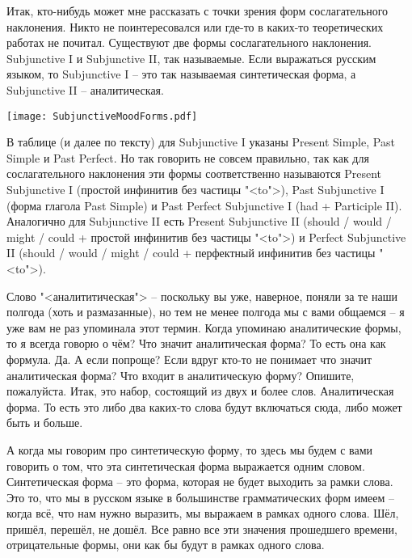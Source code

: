 \documentclass[main.tex]{subfiles}
\begin{document}
Итак, кто-нибудь может мне рассказать с точки зрения форм сослагательного наклонения.
Никто не поинтересовался или где-то в каких-то теоретических работах не почитал.
Существуют две формы сослагательного наклонения.
Subjunctive I и Subjunctive II, так называемые.
Если выражаться русским языком, то Subjunctive I -- это так называемая синтетическая форма, а Subjunctive II -- аналитическая.

\hypertarget{subjunctive-mood-forms-table}{}
{\parindent0pt\texttt{[image: SubjunctiveMoodForms.pdf]}}

 В таблице (и далее по тексту) для Subjunctive I указаны Present Simple, Past Simple и Past Perfect.
Но так говорить не совсем правильно, так как для сослагательного наклонения эти формы соответственно называются Present Subjunctive I (простой инфинитив без частицы "<to">), Past Subjunctive I (форма глагола Past Simple) и Past Perfect Subjunctive I (had + Participle II).\newline
Аналогично для Subjunctive II есть Present Subjunctive II (should / would / might / could + простой инфинитив без частицы "<to">) и Perfect Subjunctive II (should / would / might / could + перфектный инфинитив без частицы "<to">).

Слово "<аналититическая"> -- поскольку вы уже, наверное, поняли за те наши полгода (хоть и размазанные), но тем не менее полгода мы с вами общаемся -- я уже вам не раз упоминала этот термин.
Когда упоминаю аналитические формы, то я всегда говорю о чём?
Что значит аналитическая форма?
То есть она как формула.
Да.
А если попроще?
Если вдруг кто-то не понимает что значит аналитическая форма?
Что входит в аналитическую форму?
Опишите, пожалуйста.
Итак, это набор, состоящий из двух и более слов.
Аналитическая форма.
То есть это либо два каких-то слова будут включаться сюда, либо может быть и больше.

А когда мы говорим про синтетическую форму, то здесь мы будем с вами говорить о том, что эта синтетическая форма выражается одним словом.
Синтетическая форма -- это форма, которая не будет выходить за рамки слова.
Это то, что мы в русском языке в большинстве грамматических форм имеем -- когда всё, что нам нужно выразить, мы выражаем в рамках одного слова.
Шёл, пришёл, перешёл, не дошёл.
Все равно все эти значения прошедшего времени, отрицательные формы, они как бы будут в рамках одного слова.
\end{document}
